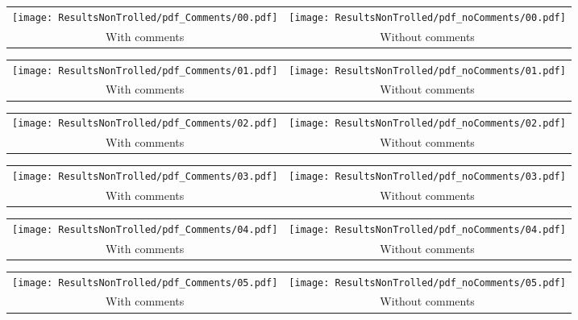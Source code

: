 \begin{tabular}{cc}
{  \texttt{[image: ResultsNonTrolled/pdf\_Comments/00.pdf]} } & 
{  \texttt{[image: ResultsNonTrolled/pdf\_noComments/00.pdf]}} \\
 With comments & Without comments \\
\end{tabular}

\begin{tabular}{cc}
{  \texttt{[image: ResultsNonTrolled/pdf\_Comments/01.pdf]} } & 
{  \texttt{[image: ResultsNonTrolled/pdf\_noComments/01.pdf]}} \\
 With comments & Without comments \\
\end{tabular}

\begin{tabular}{cc}
{  \texttt{[image: ResultsNonTrolled/pdf\_Comments/02.pdf]} } & 
{  \texttt{[image: ResultsNonTrolled/pdf\_noComments/02.pdf]}} \\
 With comments & Without comments \\
\end{tabular}

\begin{tabular}{cc}
{  \texttt{[image: ResultsNonTrolled/pdf\_Comments/03.pdf]} } & 
{  \texttt{[image: ResultsNonTrolled/pdf\_noComments/03.pdf]}} \\
 With comments & Without comments \\
\end{tabular}

\begin{tabular}{cc}
{  \texttt{[image: ResultsNonTrolled/pdf\_Comments/04.pdf]} } & 
{  \texttt{[image: ResultsNonTrolled/pdf\_noComments/04.pdf]}} \\
 With comments & Without comments \\
\end{tabular}

\begin{tabular}{cc}
{  \texttt{[image: ResultsNonTrolled/pdf\_Comments/05.pdf]} } & 
{  \texttt{[image: ResultsNonTrolled/pdf\_noComments/05.pdf]}} \\
 With comments & Without comments \\
\end{tabular}

